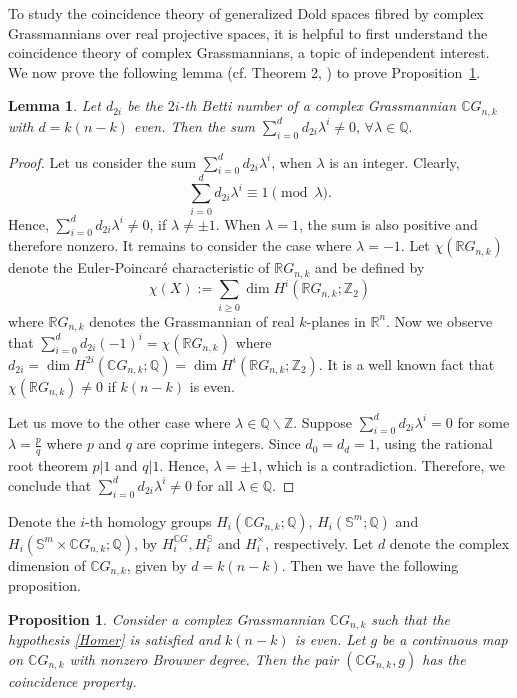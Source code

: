 \documentclass{amsart}
\newtheorem{proposition}[theorem]{Proposition}
\newtheorem{lemma}[theorem]{Lemma}
\newcommand{\propref}[1]{Proposition~\ref{#1}}
\begin{document}
	To study the coincidence theory of generalized Dold spaces fibred by complex Grassmannians over real projective spaces, it is helpful to first understand the coincidence theory of complex Grassmannians, a topic of independent interest. We now prove the following lemma (cf. Theorem 2, \cite{glover-homer}) to prove \propref{CP of CGnk}.
	\begin{lemma}\label{sum neq 0}
		Let $d_{2i}$ be the $2i$-th Betti number of a complex Grassmannian $\mathbb CG_{n,k}$ with $d=k(n-k)$ even. Then the sum \(\sum _{i=0}^d d_{2i}\lambda^i\neq 0,\, \forall \lambda \in \mathbb Q.\)
	\end{lemma}
	\begin{proof}
		Let us consider the sum $\sum_{i=0}^d d_{2i}\lambda^i$, when $\lambda$ is an integer. 
		Clearly, $$\sum_{i=0}^d d_{2i}\lambda^i \equiv 1 \pmod{\lambda}.$$ %
		Hence, $\sum_{i=0}^d d_{2i}\lambda^i \neq 0$, if $\lambda \neq \pm 1$. When $\lambda = 1$, the sum is also positive and therefore nonzero. It remains to consider the case where $\lambda = -1$.
		Let $\chi(\mathbb{R}G_{n,k})$ denote the Euler-Poincaré characteristic of $\mathbb{R}G_{n,k}$ and be defined by $$\chi(X):=\sum_{i\ge0}\dim H^i(\mathbb{R}G_{n,k};\mathbb{Z}_2)$$ where $\mathbb{R}G_{n,k}$ denotes the Grassmannian of real $k$-planes in $\mathbb{R}^n$.
		Now we observe that 
		$\sum_{i=0}^d d_{2i}(-1)^i = \chi(\mathbb{R}G_{n,k})$ where $d_{2i} = \operatorname{dim} H^{2i}(\mathbb{C}G_{n,k}; \mathbb{Q}) = \dim H^{i}(\mathbb{R}G_{n,k}; \mathbb{Z}_2)$. 
		It is a well known fact that $\chi(\mathbb{R}G_{n,k}) \neq 0$ if $k(n-k)$ is even. 
		
		Let us move to the other case where $\lambda\in \mathbb{Q}\backslash \mathbb{Z}$. Suppose $\sum_{i=0}^{d} d_{2i}\lambda^i =0$ for some $\lambda = \frac{p}{q}$ where $p$ and $q$ are coprime integers. Since $d_0 =d_d =1$, using the rational root theorem $p|1$ and $q|1$. Hence, $\lambda = \pm 1$, which is a contradiction. Therefore, we conclude that $\sum_{i=0}^{d} d_{2i}\lambda^i \neq 0$ for all $\lambda\in \mathbb Q$. 
	\end{proof}
	
	
	
	Denote the $i$-th homology groups 
	$H_i(\mathbb{C}G_{n,k}; \mathbb{Q}), \, H_i(\mathbb{S}^m; \mathbb{Q})$ and 
	$H_i(\mathbb{S}^m \times \mathbb{C}G_{n,k}; \mathbb{Q})$, by $H_i^{\mathbb{C}G}, H_i^{\mathbb{S}}$ and $H_i^{\times}$, respectively. Let $d$ denote the complex dimension of $\mathbb CG_{n,k}$, given by $d = k(n - k)$. Then we have the following proposition.
	\begin{proposition}\label{CP of CGnk}
		Consider a complex Grassmannian $\mathbb{C}G_{n,k}$ such that the hypothesis \eqref{Homer} is satisfied and $k(n-k)$ is even. Let $g $ be a continuous map on $\mathbb{C}G_{n,k}$ with nonzero Brouwer degree. Then the pair $(\mathbb{C}G_{n,k}, g)$ has the coincidence property.
	\end{proposition}
	
\end{document}
